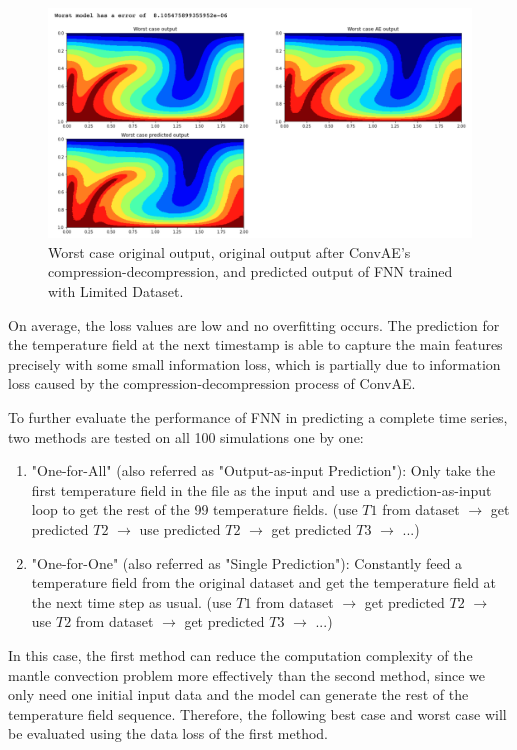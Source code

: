 \begin{figure}[H]
    \caption{Worst case original output, original output after ConvAE's compression-decompression, and predicted output of FNN trained with Limited Dataset.}
    \includegraphics[scale=0.5]{figures/mantle_convection_images/limited_dataset/FNN_Worst.png}
\end{figure}

On average, the loss values are low and no overfitting occurs. The prediction for the temperature field at the next timestamp is able to capture the main features precisely with some small information loss, which is partially due to information loss caused by the compression-decompression process of ConvAE.

To further evaluate the performance of FNN in predicting a complete time series, two methods are tested on all 100 simulations one by one: 

\begin{enumerate}
  \item "One-for-All" (also referred as "Output-as-input Prediction"): Only take the first temperature field in the file as the input and use a prediction-as-input loop to get the rest of the 99 temperature fields. (use $T1$ from dataset $\rightarrow$ get predicted $T2$ $\rightarrow$ use predicted $T2$ $\rightarrow$ get predicted $T3$ $\rightarrow$ ...)
  \item "One-for-One" (also referred as "Single Prediction"): Constantly feed a temperature field from the original dataset and get the temperature field at the next time step as usual. (use $T1$ from dataset $\rightarrow$ get predicted $T2$ $\rightarrow$ use $T2$ from dataset $\rightarrow$ get predicted $T3$ $\rightarrow$ ...)
\end{enumerate}

In this case, the first method can reduce the computation complexity of the mantle convection problem more effectively than the second method, since we only need one initial input data and the model can generate the rest of the temperature field sequence. Therefore, the following best case and worst case will be evaluated using the data loss of the first method.

